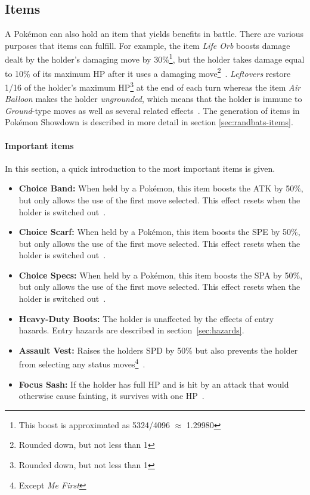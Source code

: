\subsection{Items}
\label{sec:items}
A Pokémon can also hold an item that yields benefits in battle. There are various purposes that items 
can fulfill. For example, the item \textit{Life Orb} boosts damage dealt by the holder's damaging move
by 30\%\footnote{This boost is approximated as 5324/4096 $\approx$ 1.29980}, but the holder takes
damage equal to 10\% of its maximum \ac{HP} after it uses a damaging move\footnote{Rounded down, 
but not less than 1}~\autocite{Bulbapedia:LifeOrb}. \textit{Leftovers} restore 1/16 of the holder's
maximum \ac{HP}\footnote{Rounded down, but not less than 1} at the end of each turn whereas the item
\textit{Air Balloon} makes the holder \textit{ungrounded}, which means that the holder is immune to
\textit{Ground}-type moves as well as several related effects~\autocite{Bulbapedia:AirBalloon}. The 
generation of items in Pokémon Showdown is described in more detail in section \ref{sec:randbats-items}.
\paragraph{Important items}
\label{sec:Important-items}
In this section, a quick introduction to the most important items is given.
\begin{itemize}
	\item \textbf{Choice Band:} When held by a Pokémon, this item boosts the \ac{ATK} by 50\%, but only
	allows the use of the first move selected. This effect resets when the holder is switched out~\autocite{Bulbapedia:ChoiceBand}. 
	\item \textbf{Choice Scarf:} When held by a Pokémon, this item boosts the \ac{SPE} by 50\%, but only
	allows the use of the first move selected. This effect resets when the holder is switched out~\autocite{Bulbapedia:ChoiceScarf}. 
	\item \textbf{Choice Specs:} When held by a Pokémon, this item boosts the \ac{SPA} by 50\%, but only
	allows the use of the first move selected. This effect resets when the holder is switched out~\autocite{Bulbapedia:ChoiceSpecs}. 
	\item \textbf{Heavy-Duty Boots:} The holder is unaffected by the effects of entry hazards. Entry hazards are described 
	in section~\ref{sec:hazards}.
	\item \textbf{Assault Vest:} Raises the holders \ac{SPD} by 50\% but also prevents the holder from selecting any 
	status moves\footnote{Except \textit{Me First}}~\autocite{Bulbapedia:AssaultVest}.
	\item \textbf{Focus Sash:} If the holder has full \ac{HP} and is hit by an attack that would otherwise cause fainting,
	it survives with one \ac{HP}~\autocite{Bulbapedia:FocusSash}.
\end{itemize}

